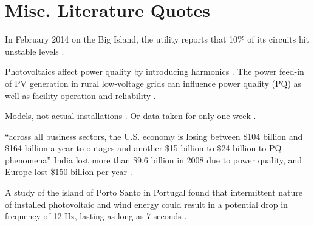 \section{Misc. Literature Quotes}

In February 2014 on the Big Island, the utility reports that 10\% of its circuits hit unstable levels \cite{trabish_solar_2014}.

Photovoltaics affect power quality by introducing harmonics \cite{anurangi_effects_2017}. The power feed-in of PV generation in rural low-voltage grids can influence power quality (PQ) as well as facility operation and reliability \cite{rita_pinto_impact_2016}.

Models, not actual installations \cite{anurangi_effects_2017,bayindir_effects_2016,farhoodnea_power_2012,shafiullah_experimental_2014}. Or data taken for only one week \cite{kucuk_assessment_2013}.

``across all business sectors, the U.S. economy is losing between \$104 billion and \$164 billion a year to outages and another \$15 billion to \$24 billion to PQ phenomena'' \cite{elphick_summary_2015} India lost more than \$9.6 billion in 2008 due to power quality, and Europe lost \$150 billion per year \cite{laskar_power_2012}.

A study of the island of Porto Santo in Portugal found that intermittent nature of installed photovoltaic and wind energy could result in a potential drop in frequency of 12 Hz, lasting as long as 7 seconds \cite{delgado_solutions_2011}.
